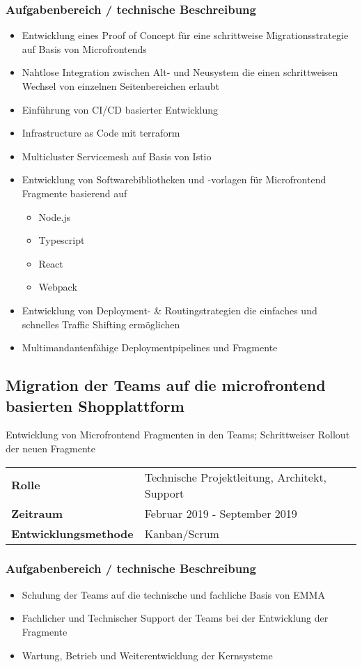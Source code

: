 \documentclass[10pt,ngerman,a4paper]{article}
\begin{document}
\subsubsection{Aufgabenbereich / technische Beschreibung}
\begin{itemize}
\item Entwicklung eines Proof of Concept für eine schrittweise Migrationsstrategie auf Basis von Microfrontends
\item Nahtlose Integration zwischen Alt- und Neusystem die einen schrittweisen Wechsel von einzelnen Seitenbereichen erlaubt
\item Einführung von CI/CD basierter Entwicklung
\item Infrastructure as Code mit terraform
\item Multicluster Servicemesh auf Basis von Istio
\item Entwicklung von Softwarebibliotheken und -vorlagen für Microfrontend Fragmente basierend auf
\begin{itemize}
\item Node.js
\item Typescript
\item React
\item Webpack
\end{itemize}
\item Entwicklung von Deployment- \& Routingstrategien die einfaches und schnelles Traffic Shifting ermöglichen
\item Multimandantenfähige Deploymentpipelines und Fragmente
\end{itemize}

\subsection{Migration der Teams auf die microfrontend basierten Shopplattform}
Entwicklung von Microfrontend Fragmenten in den Teams; Schrittweiser Rollout 
der neuen Fragmente

\begin{tabular}{ll}
\textbf{Rolle} & Technische Projektleitung, Architekt, Support \\
\textbf{Zeitraum} & Februar 2019 - September 2019\\
\textbf{Entwicklungsmethode} & Kanban/Scrum
\end{tabular}

\subsubsection{Aufgabenbereich / technische Beschreibung}
\begin{itemize}
\item Schulung der Teams auf die technische und fachliche Basis von EMMA
\item Fachlicher und Technischer Support der Teams bei der Entwicklung der Fragmente
\item Wartung, Betrieb und Weiterentwicklung der Kernsysteme
\end{itemize}
\end{document}
